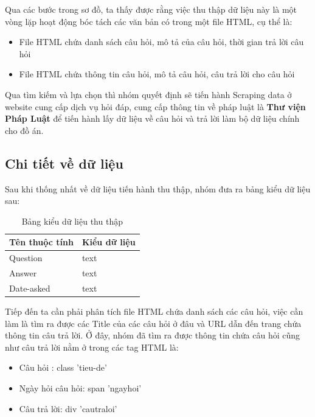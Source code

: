 Qua các bước trong sơ đồ, ta thấy được rằng việc thu thập dữ liệu này là một vòng lặp hoạt động bóc tách các văn bản có trong một file HTML, cụ thể là:

\begin{itemize}
	\item File HTML chứa danh sách câu hỏi, mô tả của câu hỏi, thời gian trả lời câu hỏi
	\item File HTML chứa thông tin câu hỏi, mô tả câu hỏi, câu trả lời cho câu hỏi
\end{itemize}
\hfill

Qua tìm kiếm và lựa chọn thì nhóm quyết định sẽ tiến hành Scraping data ở website cung cấp dịch vụ hỏi đáp, cung cấp thông tin về pháp luật là \textbf{Thư viện Pháp Luật}\cite{ThuVien} để tiến hành lấy dữ liệu về câu hỏi và trả lời làm bộ dữ liệu chính cho đồ án.

\subsection{Chi tiết về dữ liệu}

Sau khi thống nhất về dữ liệu tiến hành thu thập, nhóm đưa ra bảng kiểu dữ liệu sau:

\begin{table}[htp]
	\centering
	\caption{Bảng kiểu dữ liệu thu thập}
	\label{tab:data-type-table}
	\begin{tabular}{|l|l|}
		\hline
		Tên thuộc tính & Kiểu dữ liệu \\ \hline
		Question       & text         \\ \hline
		Answer         & text         \\ \hline
		Date-asked     & text         \\ \hline
	\end{tabular}
\end{table}
	
Tiếp đến ta cần phải phân tích file HTML chứa danh sách các câu hỏi, việc cần làm là tìm ra được các Title của các câu hỏi ở đâu và URL dẫn đến trang chứa thông tin câu trả lời. Ở đây, nhóm đã tìm ra được thông tin chứa câu hỏi cũng như câu trả lời nằm ở trong các tag HTML là:
\begin{itemize}
	\item Câu hỏi : class 'tieu-de'
	\item Ngày hỏi câu hỏi: span 'ngayhoi'
	\item Câu trả lời: div 'cautraloi'
\end{itemize}

